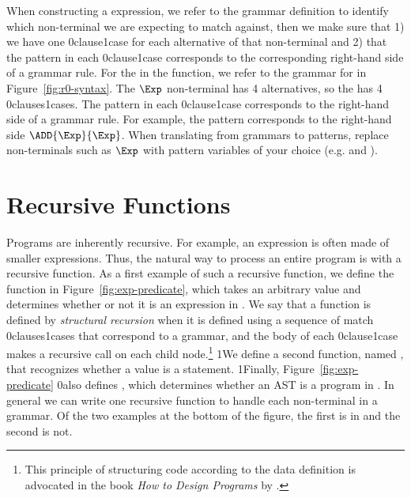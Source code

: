 \documentclass[7x10,nocrop]{TimesAPriori_MIT}%
\def\racketEd{0}
\def\pythonEd{1}
\def\edition{0}
\newcommand{\racket}[1]{{\if\edition\racketEd{#1}\fi}}
\newcommand{\python}[1]{{\if\edition\pythonEd #1\fi}}
\begin{document}
When constructing a  expression, we refer to the grammar
definition to identify which non-terminal we are expecting to match
against, then we make sure that 1) we have one
\racket{clause}\python{case} for each alternative of that non-terminal
and 2) that the pattern in each \racket{clause}\python{case}
corresponds to the corresponding right-hand side of a grammar
rule. For the  in the  function, we refer to
the grammar for \LangInt{} in Figure~\ref{fig:r0-syntax}. The $\Exp$
non-terminal has 4 alternatives, so the  has 4
\racket{clauses}\python{cases}.  The pattern in each
\racket{clause}\python{case} corresponds to the right-hand side of a
grammar rule. For example, the pattern 
corresponds to the right-hand side $\ADD{\Exp}{\Exp}$. When
translating from grammars to patterns, replace non-terminals such as
$\Exp$ with pattern variables of your choice (e.g.  and
).


\section{Recursive Functions}
\label{sec:recursion}

Programs are inherently recursive. For example, an expression is often
made of smaller expressions. Thus, the natural way to process an
entire program is with a recursive function.  As a first example of
such a recursive function, we define the function  in
Figure~\ref{fig:exp-predicate}, which takes an arbitrary value and
determines whether or not it is an expression in \LangInt{}.
%
We say that a function is defined by \emph{structural recursion} when
it is defined using a sequence of match \racket{clauses}\python{cases}
that correspond to a grammar, and the body of each
\racket{clause}\python{case} makes a recursive call on each child
node.\footnote{This principle of structuring code according to the
  data definition is advocated in the book \emph{How to Design
    Programs} by \citet{Felleisen:2001aa}.}  \python{We define a
  second function, named , that recognizes whether a value
  is a \LangInt{} statement.}  \python{Finally, }
Figure~\ref{fig:exp-predicate} \racket{also} defines ,
which determines whether an AST is a program in \LangInt{}.  In
general we can write one recursive function to handle each
non-terminal in a grammar. Of the
two examples at the bottom of the figure, the first is in
\LangInt{} and the second is not.
\end{document}
